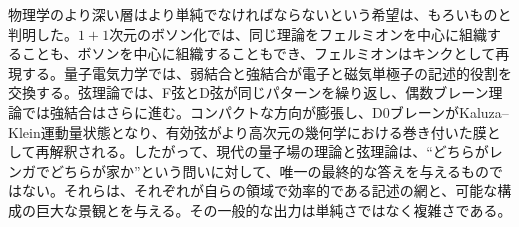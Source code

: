 物理学のより深い層はより単純でなければならないという希望は、もろいものと判明した。\(1+1\)次元のボソン化では、同じ理論をフェルミオンを中心に組織することも、ボソンを中心に組織することもでき、フェルミオンはキンクとして再現する。量子電気力学では、弱結合と強結合が電子と磁気単極子の記述的役割を交換する。弦理論では、F弦とD弦が同じパターンを繰り返し、偶数ブレーン理論では強結合はさらに進む。コンパクトな方向が膨張し、D0ブレーンがKaluza--Klein運動量状態となり、有効弦がより高次元の幾何学における巻き付いた膜として再解釈される。したがって、現代の量子場の理論と弦理論は、``どちらがレンガでどちらが家か''という問いに対して、唯一の最終的な答えを与えるものではない。それらは、それぞれが自らの領域で効率的である記述の網と、可能な構成の巨大な景観とを与える。その一般的な出力は単純さではなく複雑さである。
